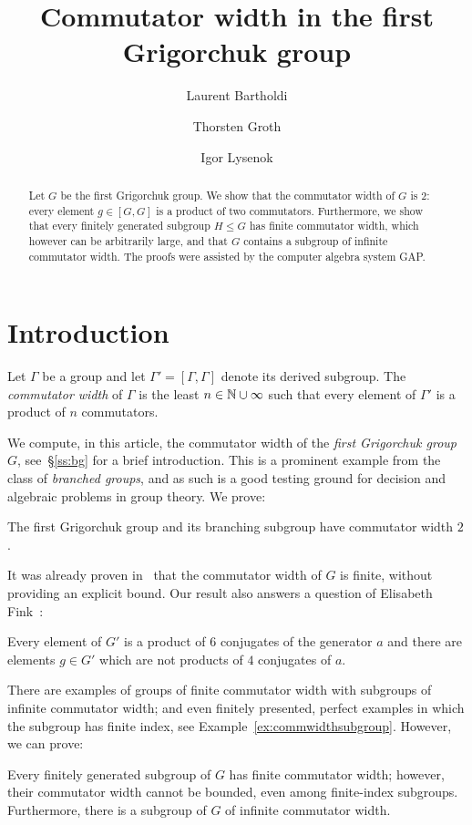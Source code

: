 \documentclass[a4paper,11pt]{amsart}
\begin{document}
\title{Commutator width in the first Grigorchuk group}
\author{Laurent Bartholdi}
\author{Thorsten Groth}
\author{Igor Lysenok}
\begin{abstract}
  Let $G$ be the first Grigorchuk group.  We show that the commutator
  width of $G$ is $2$: every element $g\in [G,G]$ is a product of two
  commutators. Furthermore, we show that every finitely generated
  subgroup $H\leq G$ has finite commutator width, which however can be
  arbitrarily large, and that $G$ contains a subgroup of infinite commutator width. The proofs were assisted by the computer algebra
  system GAP.
\end{abstract}
\maketitle

\section{Introduction}
Let $\Gamma$ be a group and let $\Gamma'=[\Gamma,\Gamma]$ denote its
derived subgroup. The \emph{commutator width} of $\Gamma$ is the least
$n\in \mathbb{N}\cup \infty$ such that every element of $\Gamma'$ is a
product of $n$ commutators.

We compute, in this article, the commutator width of the \emph{first
  Grigorchuk group} $G$, see~\S\ref{ss:bg} for a brief
introduction. This is a prominent example from the class of
\emph{branched groups}, and as such is a good testing ground for
decision and algebraic problems in group theory. We prove:
\begin{thma}\label{thm:CWGrigorchukGroup}
  The first Grigorchuk group and its branching subgroup have
  commutator width $2$.
\end{thma}
It was already proven in~\cite{Lysenok-Miasnikov-Ushakov:QuadraticEquationsInGrig} that
the commutator width of $G$ is finite, 
without providing an explicit bound.
Our result also
answers a question of Elisabeth
Fink~\cite[Question~3]{Fink:Conjugacy_growth}:
\begin{cora}\label{cor:productOf6Conjugates}
  Every element of $G'$ is a product of $6$ conjugates of the
  generator $a$ and there are elements $g\in G'$ which are 
  not products of $4$ conjugates of $a$.
\end{cora}


There are examples of groups of finite commutator width with subgroups
of infinite commutator width; and even finitely presented, perfect
examples in which the subgroup has finite index, see
Example~\ref{ex:commwidthsubgroup}. However, we can prove:
\begin{thma}\label{thm:subgroups}
  Every finitely generated subgroup of $G$ has finite commutator
  width; however, their commutator width cannot be bounded, even among
  finite-index subgroups. Furthermore, there is a subgroup of $G$ of infinite commutator width.
\end{thma}
\end{document}
